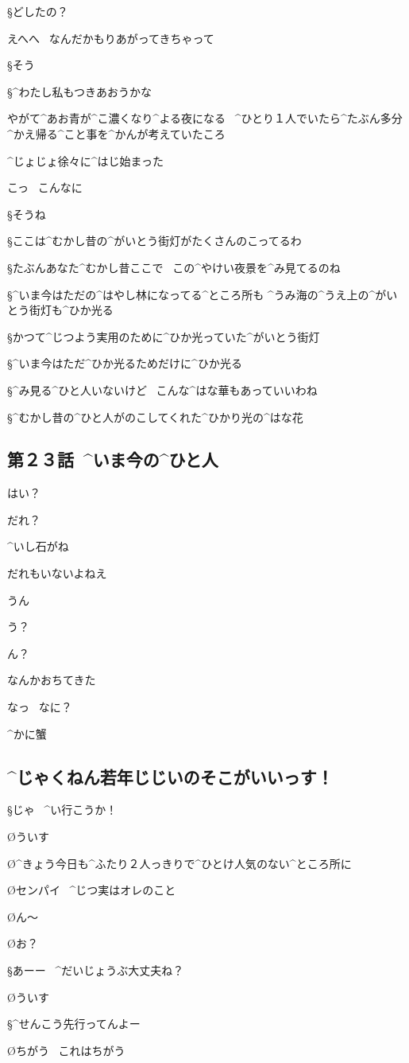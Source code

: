 \S どしたの？

\A えへへ
\ なんだかもりあがってきちゃって

\S そう

\S ^{わたし}{私}もつきあおうかな

\A やがて^{あお}{青}が^{こ}{濃}くなり^{よる}{夜}になる
\ ^{ひとり}{１人}でいたら^{たぶん}{多分}^{かえ}{帰}る^{こと}{事}を^{かんが}{考}えていたころ

\A ^{じょじょ}{徐々}に^{はじ}{始}まった

\page[112]
\A こっ
\ こんなに

\page
\S そうね

\S ここは^{むかし}{昔}の^{がいとう}{街灯}がたくさんのこってるわ

\S たぶんあなた^{むかし}{昔}ここで
\ この^{やけい}{夜景}を^{み}{見}てるのね

\S ^{いま}{今}はただの^{はやし}{林}になってる^{ところ}{所}も
^{うみ}{海}の^{うえ}{上}の^{がいとう}{街灯}も^{ひか}{光}る

\S かつて^{じつよう}{実用}のために^{ひか}{光}っていた^{がいとう}{街灯}

\page
\S ^{いま}{今}はただ^{ひか}{光}るためだけに^{ひか}{光}る

\S ^{み}{見}る^{ひと}{人}いないけど
\ こんな^{はな}{華}もあっていいわね

\page[116]
\S ^{むかし}{昔}の^{ひと}{人}がのこしてくれた^{ひかり}{光}の^{はな}{花}


\subsection{第２３話\ ^{いま}{今}の^{ひと}{人}}

\page[130]
\A はい？

\T だれ？

\A ^{いし}{石}がね

\A だれもいないよねえ

\T うん

\page
\T う？

\A ん？

\T なんかおちてきた

\A なっ
\ なに？

\T ^{かに}{蟹}


\subsection{^{じゃくねん}{若年}じじいのそこがいいっす！}

\S じゃ
\ ^{い}{行}こうか！

\O ういす

\O ^{きょう}{今日}も^{ふたり}{２人}っきりで^{ひとけ}{人気}のない^{ところ}{所}に

\O センパイ
\ ^{じつ}{実}はオレのこと

\O ん〜

\O お？

\S あーー
\ ^{だいじょうぶ}{大丈夫}ね？

\O ういす

\S ^{せんこう}{先行}ってんよー

\O ちがう
\ これはちがう
